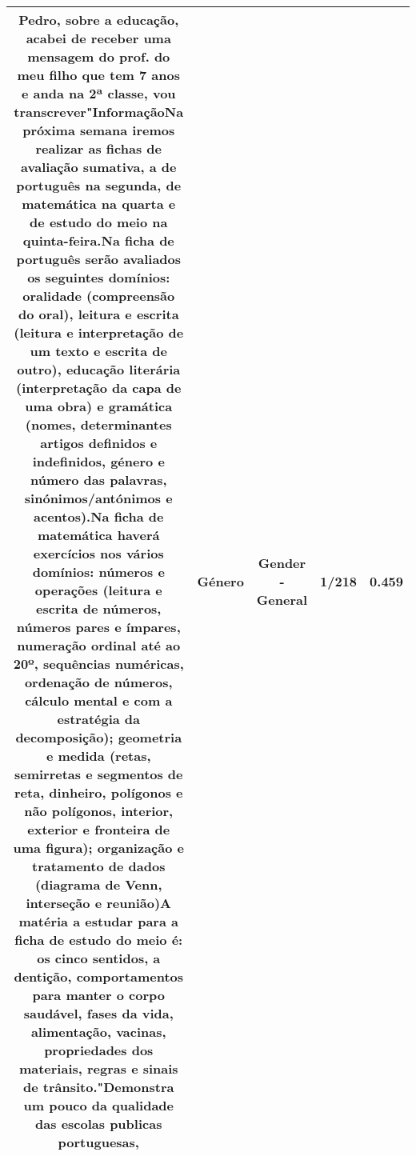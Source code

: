 \documentclass[11pt]{article}
\newlength\mylength
\begin{document}
\begin{center}
\begin{longtable}{|C{.65\mylength}|C{.30\mylength}|C{.12\mylength}|C{.12\mylength}|C{.12\mylength}|}
  \small Pedro, sobre a educação, acabei de receber uma mensagem do prof. do meu filho que tem 7 anos e anda na 2ª classe, vou transcrever"InformaçãoNa próxima semana iremos realizar as fichas de avaliação sumativa, a de português na segunda, de matemática na quarta e de estudo do meio na quinta-feira.Na ficha de português serão avaliados os seguintes domínios: oralidade (compreensão do oral), leitura e escrita (leitura e interpretação de um texto e escrita de outro), educação literária (interpretação da capa de uma obra) e gramática (nomes, determinantes artigos definidos e indefinidos, \textbf{género} e número das palavras, sinónimos/antónimos e acentos).Na ficha de matemática haverá exercícios nos vários domínios: números e operações (leitura e escrita de números, números pares e ímpares, numeração ordinal até ao 20º, sequências numéricas, ordenação de números, cálculo mental e com a estratégia da decomposição); geometria e medida (retas, semirretas e segmentos de reta, dinheiro, polígonos e não polígonos, interior, exterior e fronteira de uma figura); organização e tratamento de dados (diagrama de Venn, interseção e reunião)A matéria a estudar para a ficha de estudo do meio é: os cinco sentidos, a dentição, comportamentos para manter o corpo saudável, fases da vida, alimentação, vacinas, propriedades dos materiais, regras e sinais de trânsito."Demonstra um pouco da qualidade das escolas publicas portuguesas,\normalsize   & Género & Gender - General & 1/218 & 0.459 \\  \hline

\end{longtable}
\end{center}
\end{document}
